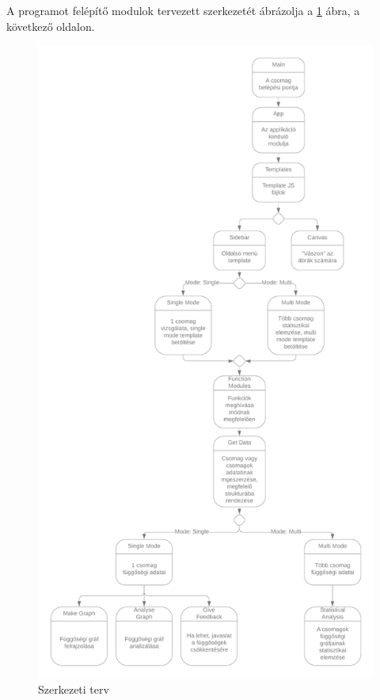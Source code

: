 \noindent A programot felépítő modulok tervezett szerkezetét ábrázolja a \ref{fig:struct_plan} ábra, a következő oldalon.

\begin{figure}[!h]
	\centering
	\includegraphics[scale=0.18]{images/struct_plan.png}
	\caption{Szerkezeti terv}
	\label{fig:struct_plan}
\end{figure}



 
